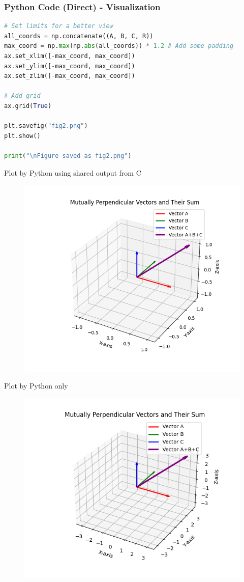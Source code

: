 \documentclass{beamer}
\begin{document}
\begin{frame}[fragile]
\frametitle{Python Code (Direct) - Visualization}
\begin{lstlisting}[language=Python]
# Set limits for a better view
all_coords = np.concatenate((A, B, C, R))
max_coord = np.max(np.abs(all_coords)) * 1.2 # Add some padding
ax.set_xlim([-max_coord, max_coord])
ax.set_ylim([-max_coord, max_coord])
ax.set_zlim([-max_coord, max_coord])

# Add grid
ax.grid(True)

plt.savefig("fig2.png")
plt.show()

print("\nFigure saved as fig2.png")
\end{lstlisting}
\end{frame}

\begin{frame}{Plot by Python using shared output from C}
\begin{figure}[H]
        \centering
        \includegraphics[width=0.7\columnwidth]{../figs/fig1.png}
        \caption{}
        \label{fig:1}
    \end{figure}
\end{frame}

 \begin{frame}{Plot by Python only}
\begin{figure}[H]
        \centering
        \includegraphics[width=0.7\columnwidth]{../figs/fig2.png}
        \caption{}
        \label{fig:2}
    \end{figure}
\end{frame}
\end{document}
